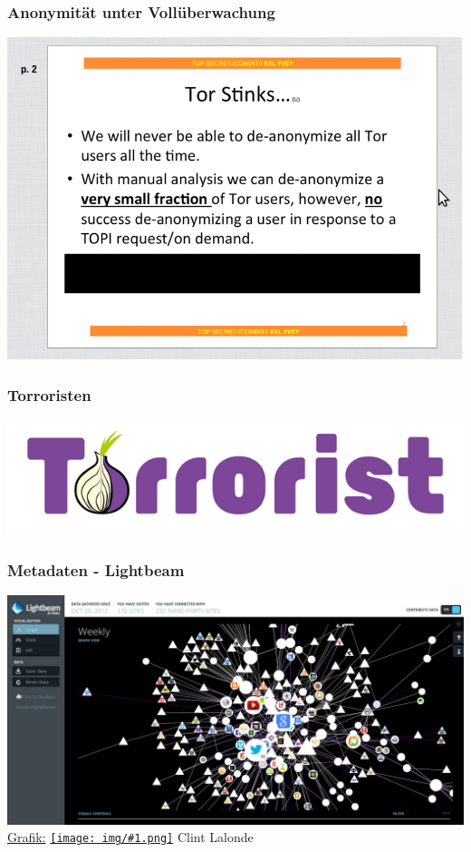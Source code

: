 \documentclass[12pt]{beamer}
\newcommand{\cc}[1]{\texttt{[image: img/\#1.png]}\hspace{1mm}}
\begin{document}
\begin{frame}
    \frametitle{Anonymität unter Vollüberwachung}
    \includegraphics[height=0.7\textheight]{img/torstinks.png}
\end{frame}

\begin{frame}
    \frametitle{Torroristen}
    \includegraphics[width=0.8\textheight]{img/torrorist.png}
\end{frame}

\begin{frame}
    \frametitle{Metadaten - Lightbeam}
    \includegraphics[height=0.7\textheight]{img/lightbeam.png}
  \\{\small \href{http://www.flickr.com/photos/8517757@N03/10538205035/in/photolist-h4e4dg}{Grafik:} \href{http://creativecommons.org/licenses/by-sa/3.0/deed.en}{\cc{by-sa}} Clint Lalonde}
\end{frame}
\end{document}
